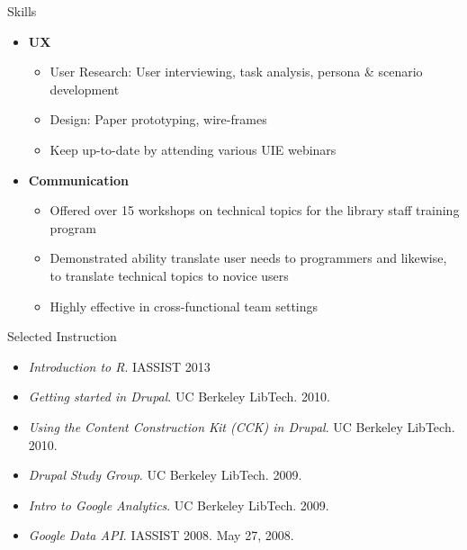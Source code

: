 \documentclass[11pt,oneside]{article}
\newenvironment{ressection}[1]{
	\vspace{4pt}
	{\fontfamily{phv}\selectfont\Large#1}
	\begin{itemize}
	\vspace{3pt}
}{
	\end{itemize}
}
\newcommand{\resitem}[1]{
	\vspace{-4pt}
	\item \begin{flushleft} #1 \end{flushleft}
}
\newcommand{\ressubitem}[1]{
	\vspace{-1pt}
	\item \begin{flushleft} #1 \end{flushleft}
}
\newenvironment{reslist}[1]{
	\resitem{\textbf{#1}}
	\vspace{-5pt}
	\begin{itemize}
}{
	\end{itemize}
}
\begin{document}
\begin{ressection}{Skills}
\begin{reslist}{UX}
	  \ressubitem{User Research: User interviewing, task analysis, persona \& scenario development}
	  
	  \ressubitem{Design: Paper prototyping, wire-frames}

    \ressubitem{Keep up-to-date by attending various UIE webinars}
    
	\end{reslist}
	
	\begin{reslist}{Communication}

    \ressubitem{Offered over 15 workshops on technical topics for the library staff training program}

    \ressubitem{Demonstrated ability translate user needs to programmers and likewise, to translate technical topics to novice users}

    \ressubitem{Highly effective in cross-functional team settings}

  \end{reslist}

\end{ressection}


\begin{ressection}{Selected Instruction}
	\resitem{\textit{Introduction to R}. IASSIST 2013}

	\resitem{\textit{Getting started in Drupal}. UC Berkeley LibTech. 2010.}

	\resitem{\textit{Using the Content Construction Kit (CCK) in Drupal}. UC Berkeley LibTech. 2010.}

	\resitem{\textit{Drupal Study Group}. UC Berkeley LibTech. 2009.}

	\resitem{\textit{Intro to Google Analytics}. UC Berkeley LibTech. 2009.}

	\resitem{\textit{Google Data API}. IASSIST 2008. May 27, 2008.}

\end{ressection}
\end{document}
